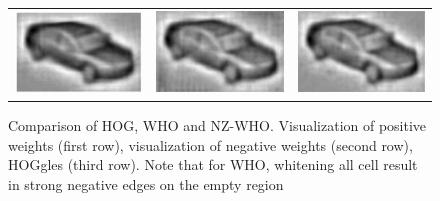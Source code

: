 \documentclass[10pt,twocolumn,letterpaper]{article}
\begin{document}
\begin{figure}[t]
\begin{center}
\begin{tabular}{ccc}
     \includegraphics[width=0.28\linewidth]{ihog_hog200_crop.png} &
     \includegraphics[width=0.28\linewidth]{ihog_whiten_all200_crop.png} &
     \includegraphics[width=0.28\linewidth]{ihog_whiten_non_zero200_crop.png} \\
 \end{tabular}
  \end{center}
  \caption{Comparison of HOG, WHO and NZ-WHO. Visualization of positive weights (first row),  visualization of negative weights (second row), HOGgles \cite{vondrick2013} (third row). Note that for WHO, whitening all cell result in strong negative edges on the empty region}
  \label{fig:whocomparison}
\end{figure}


\end{document}
